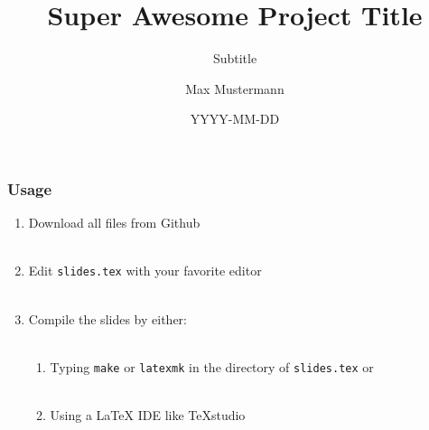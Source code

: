 \documentclass[aspectratio=1610]{beamer}
\title[Short Title]{Super Awesome Project Title}
\subtitle{Subtitle}
\author{Max Mustermann}
\date{YYYY-MM-DD}
\institute{Helmholtz Center ABC}
\begin{document}
\maketitle
{}
\maketitle[energy]
\maketitle[health]
\maketitle[information]
\maketitle[matter]
\maketitle[computing]
\maketitle[chip]
\maketitle[abstract]

\begin{frame}
    \frametitle{Usage}

    \begin{enumerate}
        \item Download all files from Github\\~
        \item Edit \texttt{slides.tex} with your favorite editor\\~
        \item Compile the slides by either:\\~
        \begin{enumerate}
            \item Typing \texttt{make} or \texttt{latexmk} in the directory of \texttt{slides.tex} or\\~
            \item Using a LaTeX IDE like TeXstudio\\~
        \end{enumerate}
    \end{enumerate}
\end{frame}
\end{document}
